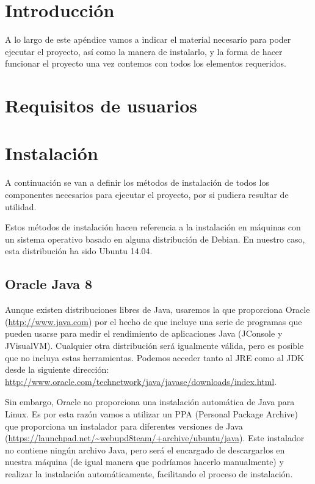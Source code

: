 
\section{Introducción}

A lo largo de este apéndice vamos a indicar el material necesario para poder ejecutar el proyecto, así como la manera de instalarlo, y la forma de hacer funcionar el proyecto una vez contemos con todos los elementos requeridos.

\section{Requisitos de usuarios}



\section{Instalación}\label{sec:Instalacion}

A continuación se van a definir los métodos de instalación de todos los componentes necesarios para ejecutar el proyecto, por si pudiera resultar de utilidad.

Estos métodos de instalación hacen referencia a la instalación en máquinas con un sistema operativo basado en alguna distribución de Debian. En nuestro caso, esta distribución ha sido Ubuntu 14.04.

\subsection{Oracle Java 8}

Aunque existen distribuciones libres de Java, usaremos la que proporciona Oracle (\url{http://www.java.com}) por el hecho de que incluye una serie de programas que pueden usarse para medir el rendimiento de aplicaciones Java (JConsole y JVisualVM). Cualquier otra distribución será igualmente válida, pero es posible que no incluya estas herramientas. Podemos acceder tanto al JRE como al JDK desde la siguiente dirección: \url{http://www.oracle.com/technetwork/java/javase/downloads/index.html}.

Sin embargo, Oracle no proporciona una instalación automática de Java para Linux. Es por esta razón vamos a utilizar un PPA (Personal Package Archive) que proporciona un instalador para diferentes versiones de Java (\url{https://launchpad.net/~webupd8team/+archive/ubuntu/java}). Este instalador no contiene ningún archivo Java, pero será el encargado de descargarlos en nuestra máquina (de igual manera que podríamos hacerlo manualmente) y realizar la instalación automáticamente, facilitando el proceso de instalación.

